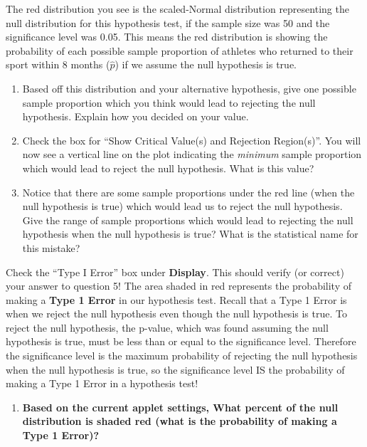 \documentclass[
]{report}
\providecommand{\tightlist}{%
  \setlength{\itemsep}{0pt}\setlength{\parskip}{0pt}}
\begin{document}
The red distribution you see is the scaled-Normal distribution representing the null distribution for this hypothesis test, if the sample size was 50 and the significance level was 0.05. This means the red distribution is showing the probability of each possible sample proportion of athletes who returned to their sport within 8 months (\(\hat{p}\)) if we assume the null hypothesis is true.

\begin{enumerate}
\def\labelenumi{\arabic{enumi}.}
\setcounter{enumi}{2}
\item
  Based off this distribution and your alternative hypothesis, give one possible sample proportion which you think would lead to rejecting the null hypothesis. Explain how you decided on your value.
  \vspace{0.25in}
\item
  Check the box for ``Show Critical Value(s) and Rejection Region(s)''. You will now see a vertical line on the plot indicating the \emph{minimum} sample proportion which would lead to reject the null hypothesis. What is this value?\\
  \vspace{0.25in}
\item
  Notice that there are some sample proportions under the red line (when the null hypothesis is true) which would lead us to reject the null hypothesis. Give the range of sample proportions which would lead to rejecting the null hypothesis when the null hypothesis is true? What is the statistical name for this mistake?
  \vspace{0.4in}
\end{enumerate}

Check the ``Type I Error'' box under \textbf{Display}. This should verify (or correct) your answer to question 5! The area shaded in red represents the probability of making a \textbf{Type 1 Error} in our hypothesis test. Recall that a Type 1 Error is when we reject the null hypothesis even though the null hypothesis is true. To reject the null hypothesis, the p-value, which was found assuming the null hypothesis is true, must be less than or equal to the significance level. Therefore the significance level is the maximum probability of rejecting the null hypothesis when the null hypothesis is true, so the significance level IS the probability of making a Type 1 Error in a hypothesis test!

\begin{enumerate}
\def\labelenumi{\arabic{enumi}.}
\setcounter{enumi}{5}
\tightlist
\item
  \textbf{Based on the current applet settings, What percent of the null distribution is shaded red (what is the probability of making a Type 1 Error)?}
  \vspace{0.25in}
\end{enumerate}
\end{document}
